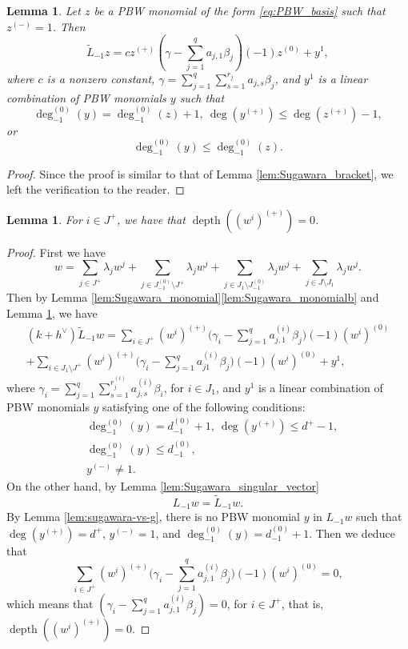 \documentclass[11pt]{article}
\numberwithin{equation}{section}
\let\oldvee\vee
\renewcommand{\vee}{{\scriptscriptstyle\oldvee}}
\let\be\beta
\DeclareMathOperator{\dep}{depth}
\newtheorem{lem}[theorem]{Lemma}
\theoremstyle{definition}
\begin{document}
\begin{lem}\label{Sugawara1}
Let $z$ be a PBW monomial of the form \eqref{eq:PBW_basis}
such that $z^{(-)}=1$. Then
\begin{equation*}
\tilde{L}_{-1}z
= c z^{(+)}(\gamma-\sum_{j=1}^qa_{j,1}\be_j)(-1)z^{(0)}+y^1,
\end{equation*}
where $c$ is a nonzero constant,
$\gamma=\sum_{j=1}^q\sum_{s=1}^{r_j}a_{j,s}\be_j$, and
$y^1$ is a linear combination of PBW monomials $y$ such that
\[
\deg_{-1}^{(0)}(y)=\deg_{-1}^{(0)}(z)+1, \ \deg(y^{(+)})\leq \deg(z^{(+)})-1,
\]
or
\[
\deg_{-1}^{(0)}(y)\leq \deg_{-1}^{(0)}(z).
\]
\end{lem}
\begin{proof}
Since the proof is similar to that of Lemma \ref{lem:Sugawara_bracket},
we left the verification to the reader.
\end{proof}

{
\begin{lem}\label{lem:wi_+}
For $i\in J^+$, we have that $\dep((w^i)^{(+)})=0$.
\end{lem}
\begin{proof} First we have
\[
w = \sum_{j \in J^+} \lambda_j w^j+\sum_{j \in J_{-1}^{(0)}\setminus J^+} \lambda_j w^j+\sum_{j \in J_1\setminus J_{-1}^{(0)}} \lambda_j w^j+\sum_{j \in J\setminus J_1} \lambda_j w^j.
\]
Then by Lemma \ref{lem:Sugawara_monomial}\eqref{lem:Sugawara_monomialb} and Lemma \ref{Sugawara1}, we have
\begin{multline*}
(k+h^{\vee})\tilde{L}_{-1}w
=\sum_{i\in J^+}(w^i)^{(+)} \biggl(\gamma_i-\sum_{j=1}^q
a_{j,1}^{(i)}\be_j\biggr)(-1)(w^i)^{(0)}\\[-8pt]
+\sum_{i\in J_1\setminus J^+}(w^i)^{(+)}\biggl(\gamma_i-\sum_{j=1}^qa^{(i)}_{j1}\be_j\biggr)(-1)(w^i)^{(0)}+y^1,
\end{multline*}
where
{$\gamma_i=\sum_{j=1}^q\sum_{s=1}^{r^{(i)}_j}a^{(i)}_{j,s}\be_i$},
for $i\in J_1$, and $y^1$ is a linear combination of PBW monomials $y$ satisfying
one of the following conditions:
\begin{align*}
& \deg_{-1}^{(0)}(y)=d_{-1}^{(0)}+1, \ \deg(y^{(+)})\leq d^+-1,\\
& \deg_{-1}^{(0)}(y)\leq d_{-1}^{(0)},\\
& y^{(-)}\neq 1.
\end{align*}
On the other hand, by Lemma \ref{lem:Sugawara_singular_vector}
\[
L_{-1}w=\tilde{L}_{-1}w.
\]
By Lemma \ref{lem:sugawara-vs-g}, there is no PBW monomial $y$ in $L_{-1}w$ such that $\deg(y^{(+)})=d^+$, $y^{(-)}=1$, and $\deg_{-1}^{(0)}(y)=d_{-1}^{(0)}+1$. Then we deduce that
\[
\sum_{i\in J^+}(w^i)^{(+)}\biggl(\gamma_i-\sum_{j=1}^qa_{j,1}^{(i)}\be_j\biggr)(-1)(w^i)^{(0)}=0,
\]
which means that ${(\gamma_i-\sum_{j=1}^qa_{j,1}^{(i)}\be_j)}=0$, for $i\in J^+$, that is, $\dep((w^i)^{(+)})=0$.
\end{proof}}
\end{document}
